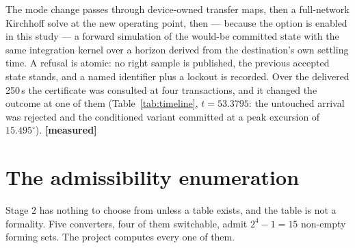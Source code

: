 \documentclass[12pt,a4paper]{article}
\theoremstyle{remark}
\newcommand{\measured}{\textcolor{ok}{\textbf{[measured]}}}
\begin{document}
The mode change passes through device-owned transfer maps, then a full-network
Kirchhoff solve at the new operating point, then --- because the option is
enabled in this study --- a forward simulation of the would-be committed state
with the same integration kernel over a horizon derived from the destination's
own settling time. A refusal is atomic: no right sample is published, the
previous accepted state stands, and a named identifier plus a lockout is
recorded. Over the delivered 250\,s the certificate was consulted at four
transactions, and it changed the outcome at one of them
(Table~\ref{tab:timeline}, $t = 53.3795$: the untouched arrival was rejected and
the conditioned variant committed at a peak excursion of $15.495^{\circ}$).
\measured

\section{The admissibility enumeration}\label{sec:admissibility}

Stage 2 has nothing to choose from unless a table exists, and the table is not a
formality. Five converters, four of them switchable, admit $2^4 - 1 = 15$
non-empty forming sets. The project computes every one of them.
\end{document}
